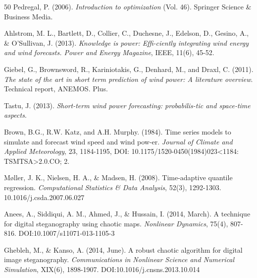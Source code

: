 \documentclass[colTwo]{IIR}
\theoremstyle{definition}
\begin{document}
\begin{thebibliography}{50}			
\harvarditem{}{}{}Pedregal, P. (2006). \textit{Introduction to optimization} (Vol. 46). Springer Science \& Business Media.

\harvarditem{}{}{}Ahlstrom, M. L., Bartlett, D., Collier, C., Duchesne, J., Edelson, D., Gesino, A., \& O'Sullivan, J. (2013). \textit{Knowledge is power: Effi-ciently integrating wind energy and wind forecasts. Power and Energy Magazine}, IEEE, 11(6), 45-52.

\harvarditem{}{}{}Giebel, G., Brownsword, R., Kariniotakis, G., Denhard, M., and Draxl, C. (2011). \textit{The state of the art in short term prediction of wind power: A literature overview}. Technical report, ANEMOS. Plus.

\harvarditem{}{}{}Tastu, J. (2013). \textit{Short-term wind power forecasting: probabilis-tic and space-time aspects}.

\harvarditem{}{}{}Brown, B.G., R.W. Katz, and A.H. Murphy. (1984). Time series models to simulate and forecast wind speed and wind pow-er. \textit{Journal of Climate and Applied Meteorology}, 23, 1184-1195, DOI: 10.1175/1520-0450(1984)023<1184: TSMTSA>2.0.CO; 2.

\harvarditem{}{}{} M\o{}ller, J. K., Nielsen, H. A., \& Madsen, H. (2008). Time-adaptive quantile regression. \textit{Computational Statistics \& Data Analysis}, 52(3), 1292-1303. 10.1016/j.csda.2007.06.027
	
	
\harvarditem{}{}{}  Anees, A., Siddiqui, A. M., Ahmed, J., \& Hussain, I. (2014, March). A technique for digital steganography using chaotic maps. \textit{Nonlinear Dynamics}, 75(4), 807-816. DOI:10.1007/s11071-013-1105-3


\harvarditem{}{}{}Ghebleh, M., \& Kanso, A. (2014, June). A robust chaotic algorithm for digital image steganography. \textit{Communications in Nonlinear Science and Numerical Simulation}, XIX(6), 1898-1907. DOI:10.1016/j.cnsns.2013.10.014
	
\end{thebibliography}
\end{document}
